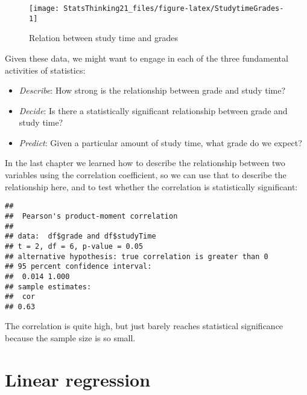 \documentclass[]{book}
\newenvironment{Shaded}{\begin{snugshade}}{\end{snugshade}}
\newcommand{\KeywordTok}[1]{\textcolor[rgb]{0.13,0.29,0.53}{\textbf{#1}}}
\newcommand{\DataTypeTok}[1]{\textcolor[rgb]{0.13,0.29,0.53}{#1}}
\newcommand{\StringTok}[1]{\textcolor[rgb]{0.31,0.60,0.02}{#1}}
\newcommand{\CommentTok}[1]{\textcolor[rgb]{0.56,0.35,0.01}{\textit{#1}}}
\newcommand{\OperatorTok}[1]{\textcolor[rgb]{0.81,0.36,0.00}{\textbf{#1}}}
\newcommand{\NormalTok}[1]{#1}
\providecommand{\tightlist}{%
  \setlength{\itemsep}{0pt}\setlength{\parskip}{0pt}}
\theoremstyle{definition}
\theoremstyle{definition}
\theoremstyle{definition}
\theoremstyle{remark}
\begin{document}
\begin{figure}
\texttt{[image: StatsThinking21\_files/figure-latex/StudytimeGrades-1]} \caption{Relation between study time and grades}\label{fig:StudytimeGrades}
\end{figure}

Given these data, we might want to engage in each of the three
fundamental activities of statistics:

\begin{itemize}
\tightlist
\item
  \emph{Describe}: How strong is the relationship between grade and
  study time?
\item
  \emph{Decide}: Is there a statistically significant relationship
  between grade and study time?
\item
  \emph{Predict}: Given a particular amount of study time, what grade do
  we expect?
\end{itemize}

In the last chapter we learned how to describe the relationship between
two variables using the correlation coefficient, so we can use that to
describe the relationship here, and to test whether the correlation is
statistically significant:

\begin{Shaded}
\end{Shaded}

\begin{verbatim}
## 
##  Pearson's product-moment correlation
## 
## data:  df$grade and df$studyTime
## t = 2, df = 6, p-value = 0.05
## alternative hypothesis: true correlation is greater than 0
## 95 percent confidence interval:
##  0.014 1.000
## sample estimates:
##  cor 
## 0.63
\end{verbatim}

The correlation is quite high, but just barely reaches statistical
significance because the sample size is so small.

\section{Linear regression}\label{linear-regression}
\end{document}
